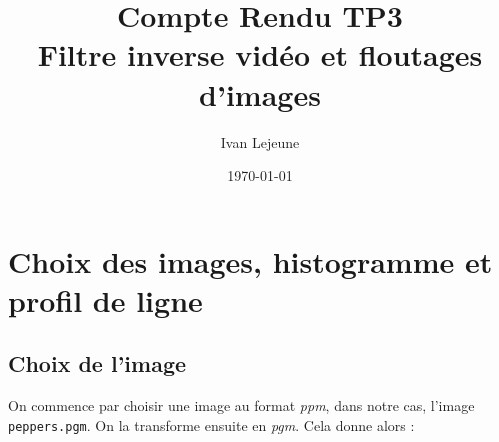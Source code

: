 \documentclass[french,a4paper,10pt]{article}
\title{Compte Rendu TP3\\Filtre inverse vidéo et floutages d'images}
\author{Ivan Lejeune}
\date{\today}
\begin{document}
    \maketitle

    \tableofcontents

    \newpage
    \section{Choix des images, histogramme et profil de ligne}\label{sec:1}

    \subsection{Choix de l'image}\label{subsec:1.1}

    On commence par choisir une image au format \emph{ppm}, dans notre cas, l'image \texttt{peppers.pgm}.
    On la transforme ensuite en \emph{pgm}.
    Cela donne alors :
\end{document}
